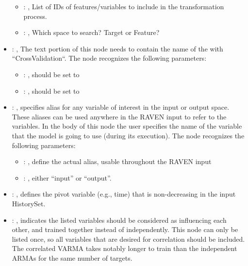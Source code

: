 \begin{itemize}
\begin{itemize}
        \item {}: ,
          List of IDs of features/variables to include in the transformation process.

        \item {}: ,
          Which space to search? Target or Feature?
      \end{itemize}

    \item {}: ,
      The text portion of this node needs to contain the name of the  with
               ``CrossValidation``.
      The  node recognizes the following parameters:
        \begin{itemize}
          \item {}: ,
            should be set to 
          \item {}: ,
            should be set to 
      \end{itemize}

    \item {}: ,
      specifies alias for         any variable of interest in the input or output space. These
      aliases can be used anywhere in the RAVEN input to         refer to the variables. In the body
      of this node the user specifies the name of the variable that the model is going to use
      (during its execution).
      The  node recognizes the following parameters:
        \begin{itemize}
          \item {}: ,
            define the actual alias, usable throughout the RAVEN input
          \item {}: ,
            either ``input'' or ``output''.
      \end{itemize}

    \item {}: ,
      defines the pivot variable (e.g., time) that is non-decreasing in
      the input HistorySet.

    \item {}: ,
      indicates the listed variables                                                    should be
      considered as influencing each other, and trained together instead of independently.  This
      node                                                    can only be listed once, so all
      variables that are desired for correlation should be included.  \nb The
      correlated VARMA takes notably longer to train than the independent ARMAs for the same number
      of targets.


\end{itemize}
